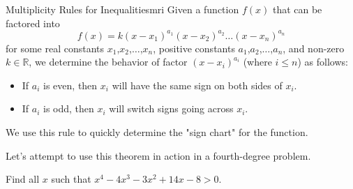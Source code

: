 \documentclass[lang=en,11pt]{elegantbook}
\begin{document}
\begin{theorem}{Multiplicity Rules for Inequalities}{mri}
Given a function $f(x)$ that can be factored into $$f(x)=k(x-x_1)^{a_1}(x-x_2)^{a_2}\ldots(x-x_n)^{a_n}$$ for some real constants $x_1$,$x_2$,$\ldots$,$x_n$, positive constants $a_1$,$a_2$,$\ldots$,$a_n$, and non-zero $k\in\mathbb{R}$, we determine the behavior of factor $(x-x_i)^{a_i}$ (where $i\leq n$) as follows: \begin{itemize}
    \item If $a_i$ is even, then $x_i$ will have the same sign on both sides of $x_i$.
    \item If $a_i$ is odd, then $x_i$ will switch signs going across $x_i$.
\end{itemize}
We use this rule to quickly determine the "sign chart" for the function.
\end{theorem}
Let's attempt to use this theorem in action in a fourth-degree problem.
\begin{example}
Find all $x$ such that $x^4-4x^3-3x^2+14x-8>0$.
\end{example}
\end{document}
